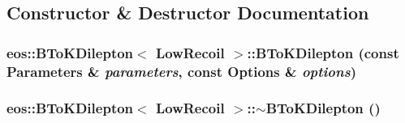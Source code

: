\subsection{Constructor \& Destructor Documentation}
\hypertarget{classeos_1_1BToKDilepton_3_01LowRecoil_01_4_ad711a9abe879818c986669eb151385ea}{
\subsubsection[{BToKDilepton}]{\setlength{\rightskip}{0pt plus 5cm}eos::BToKDilepton$<$ {\bf LowRecoil} $>$::BToKDilepton (const {\bf Parameters} \& {\em parameters}, \/  const {\bf Options} \& {\em options})}}
\label{classeos_1_1BToKDilepton_3_01LowRecoil_01_4_ad711a9abe879818c986669eb151385ea}
\hypertarget{classeos_1_1BToKDilepton_3_01LowRecoil_01_4_a6402c66ad633e2660383fcb48b95ff80}{
\subsubsection[{$\sim$BToKDilepton}]{\setlength{\rightskip}{0pt plus 5cm}eos::BToKDilepton$<$ {\bf LowRecoil} $>$::$\sim$BToKDilepton ()}}
\label{classeos_1_1BToKDilepton_3_01LowRecoil_01_4_a6402c66ad633e2660383fcb48b95ff80}


